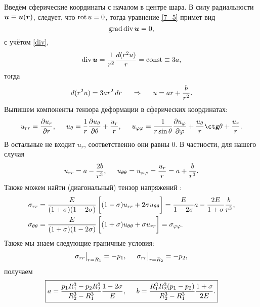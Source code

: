 Введём сферические координаты с началом в центре шара. В силу радиальности $\mbox{\boldmath $u$} \equiv \mbox{\boldmath $u$} (\mbox{\boldmath $r$})$, следует, что $\mathop{\mathrm{rot}}\nolimits u = 0$, тогда уравнение \eqref{7_5} примет вид
\begin{equation}
    \mathop{\mathrm{grad}}\nolimits \mathop{\mathrm{div}}\nolimits \mbox{\boldmath $u$} = 0,
\end{equation}
с учётом \eqref{div}, 
$$
    \mathop{\mathrm{div}}\nolimits \mbox{\boldmath $u$} = \frac{1}{r^2} \frac{d (r^2 u)}{r} = \text{const} \equiv 3 a,
$$
тогда
$$
    d (r^2 u) = 3 a r^2 \, d r
    \hspace{0.5cm} \Rightarrow \hspace{0.5cm} 
    u = ar + \frac{b}{r^2}.
$$
Выпишем  компоненты тензора деформации в сферических координатах:
$$
    u_{rr} = \frac{\partial u_r}{\partial r},
     \hspace{0.5cm} 
    u_{\theta} = \frac{1}{r} \frac{\partial u_{\theta}}{\partial \theta} + \frac{u_r}{r},
    \hspace{0.5cm} 
    u_{\varphi\varphi} = 
    \frac{1}{r \sin \theta} \frac{\partial u_{\varphi}}{\partial \varphi} 
    +
    \frac{u_\theta}{r} \ctg \theta + \frac{u_r}{r}.
$$
В остальные не входит $u_r$, соответственно они равны $0$. В частности, для нашего случая
\begin{align}
   u_{rr} = a - \frac{2b}{r^3}, \hspace{0.5cm} u_{\theta\theta} = u_{\varphi\varphi} = \frac{u_r}{r} = a+\frac{b}{r^3}.
\end{align}
Также можем найти (диагональный) тензор напряжений :
\begin{align}
    \sigma_{rr} 
    &= 
    \frac{E}{(1+\sigma)(1-2\sigma)} 
    \left[
    \vphantom{\frac{1}{2}}
    (1-\sigma) u_{rr} + 2 \sigma u_{\theta\theta}
    \right] 
    = \frac{E}{1-2\sigma} a - \frac{2E}{1+\sigma} \frac{b}{r^3},
    \\
    \sigma_{\theta\theta} 
    &= 
    \frac{E}{(1+\sigma)(1-2\sigma)} 
    \left[
    \vphantom{\frac{1}{2}}
    (1 + \sigma) u_{\theta\theta} + \sigma u_{rr}
    \right] =
    \sigma_{\varphi\varphi}.
\end{align}
Также мы знаем следующие граничные условия:
$$
    \sigma_{rr} \big|_{r=R_1} = -p_1,
    \hspace{0.5cm} 
    \sigma_{rr} \big|_{r=R_2} = -p_2,
$$
получаем
\begin{equation}
\boxed{
    a = \frac{p_1 R_1^3 - p_2 R_2^3}{R_2^3-R_1^3} \frac{1-2\sigma}{E},
    \hspace{0.5cm} 
    b = \frac{R_1^3 R_2^3 (p_1-p_2)}{R_2^3-R_1^3} \frac{1+\sigma}{2E}.
}
\end{equation}

